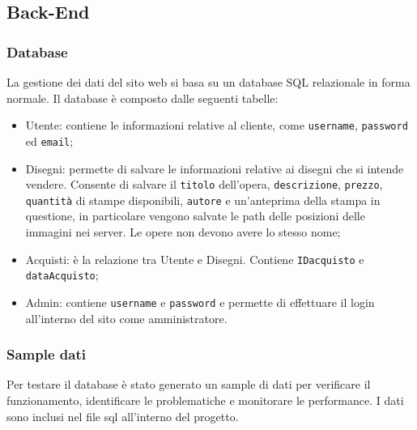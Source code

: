 \documentclass[11pt]{article}
\begin{document}
\subsection{Back-End}
\label{sec:org95444ba}
\subsubsection{Database}
\label{sec:org5ad9b63}
La gestione dei dati del sito web si basa su un database SQL relazionale in forma normale. Il database è composto dalle seguenti tabelle:
\begin{itemize}
\item Utente: contiene le informazioni relative al cliente, come \texttt{username}, \texttt{password} ed \texttt{email};
\item Disegni: permette di salvare le informazioni relative ai disegni che si intende vendere. Consente di salvare il \texttt{titolo} dell'opera, \texttt{descrizione}, \texttt{prezzo}, \texttt{quantità} di stampe disponibili, \texttt{autore} e un'anteprima della stampa in questione, in particolare vengono salvate le path delle posizioni delle immagini nei server. Le opere non devono avere lo stesso nome;
\item Acquisti: è la relazione tra Utente e Disegni. Contiene \texttt{IDacquisto} e \texttt{dataAcquisto};
\item Admin: contiene \texttt{username} e \texttt{password} e permette di effettuare il login all'interno del sito come amministratore.
\begin{center}

\end{center}
\end{itemize}
\subsubsection{Sample dati}
\label{sec:org6f92178}
Per testare il database è stato generato un sample di dati per verificare il funzionamento, identificare le problematiche e monitorare le performance. I dati sono inclusi nel file sql all'interno del progetto.
\end{document}
